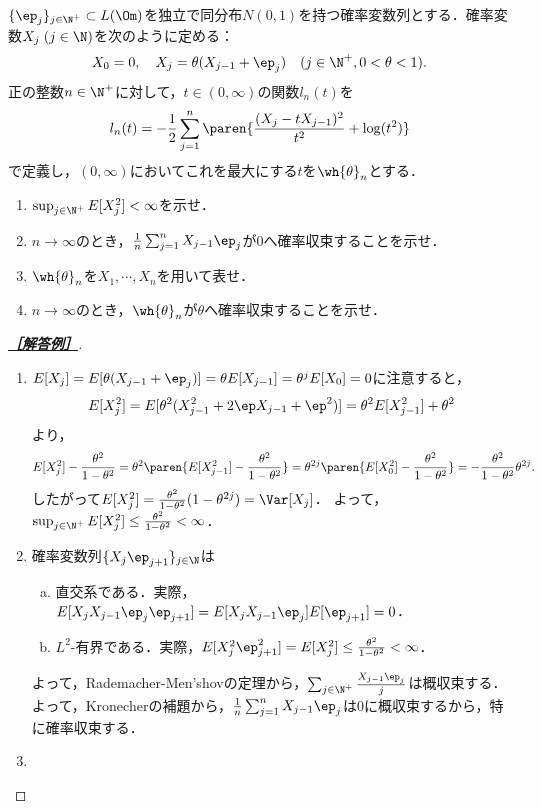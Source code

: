 \documentclass[uplatex,dvipdfmx]{jsarticle}
\begin{document}
\begin{tcolorbox}[colframe=ForestGreen, colback=ForestGreen!10!white,breakable,colbacktitle=ForestGreen!40!white,coltitle=black,fonttitle=\bfseries\sffamily,
    title=B 第16問（確率論）]
    $\{\ep_j\}_{j\in\N^+}\subset L(\Om)$を独立で同分布$N(0,1)$を持つ確率変数列とする．確率変数$X_j\;(j\in\N)$を次のように定める：
    \[X_0=0,\quad X_j=\theta(X_{j-1}+\ep_j)\quad(j\in\N^+,0<\theta<1).\]
    正の整数$n\in\N^+$に対して，$t\in(0,\infty)$の関数$l_n(t)$を
    \[l_n(t)=-\frac{1}{2}\sum_{j=1}^n\paren{\frac{(X_j-tX_{j-1})^2}{t^2}+\log(t^2)}\]
    で定義し，$(0,\infty)$においてこれを最大にする$t$を$\wh{\theta}_n$とする．
    \begin{enumerate}
        \item $\sup_{j\in\N^+}E[X_j^2]<\infty$を示せ．
        \item $n\to\infty$のとき，$\frac{1}{n}\sum_{j=1}^nX_{j-1}\ep_j$が$0$へ確率収束することを示せ．
        \item $\wh{\theta}_n$を$X_1,\cdots,X_n$を用いて表せ．
        \item $n\to\infty$のとき，$\wh{\theta}_n$が$\theta$へ確率収束することを示せ．
    \end{enumerate}
\end{tcolorbox}
\begin{proof}[\textbf{\underline{［解答例］}}]\mbox{}
    \begin{enumerate}
        \item $E[X_j]=E[\theta(X_{j-1}+\ep_j)]=\theta E[X_{j-1}]=\theta^jE[X_0]=0$に注意すると，
        \[E[X_j^2]=E[\theta^2(X_{j-1}^2+2\ep X_{j-1}+\ep^2)]=\theta^2 E[X_{j-1}^2]+\theta^2\]
        より，
        \[E[X_j^2]-\frac{\theta^2}{1-\theta^2}=\theta^2\paren{E[X_{j-1}^2]-\frac{\theta^2}{1-\theta^2}}=\theta^{2j}\paren{E[X_{0}^2]-\frac{\theta^2}{1-\theta^2}}=-\frac{\theta^2}{1-\theta^2}\theta^{2j}.\]
        したがって$E[X_j^2]=\frac{\theta^2}{1-\theta^2}(1-\theta^{2j})=\Var[X_j]$．
        よって，$\sup_{j\in\N^+}E[X_j^2]\le\frac{\theta^2}{1-\theta^2}<\infty$．
        \item 確率変数列$\{X_j\ep_{j+1}\}_{j\in\N}$は
        \begin{enumerate}[(a)]
            \item 直交系である．実際，$E[X_jX_{j-1}\ep_{j}\ep_{j+1}]=E[X_jX_{j-1}\ep_{j}]E[\ep_{j+1}]=0$．
            \item $L^2$-有界である．実際，$E[X_j^2\ep_{j+1}^2]=E[X_j^2]\le\frac{\theta^2}{1-\theta^2}<\infty$．
        \end{enumerate}
        よって，Rademacher-Men'shovの定理から，$\sum_{j\in\N^+}\frac{X_{j-1}\ep_j}{j}$は概収束する．よって，Kronecherの補題から，$\frac{1}{n}\sum_{j=1}^nX_{j-1}\ep_j$は$0$に概収束するから，特に確率収束する．
        \item 
    \end{enumerate}
\end{proof}
\end{document}
